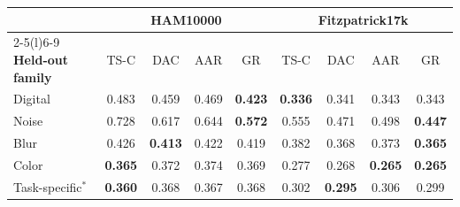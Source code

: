 \begin{tabular}{@{}lcccccccc@{}}
\toprule
 & \multicolumn{4}{c}{\textbf{HAM10000}} & \multicolumn{4}{c}{\textbf{Fitzpatrick17k}} \\
\cmidrule(lr){2-5}\cmidrule(l){6-9}
\textbf{Held-out family} & TS-C & DAC & AAR & GR & TS-C & DAC & AAR & GR \\
\midrule
Digital & 0.483 & 0.459 & 0.469 & \textbf{0.423} & \textbf{0.336} & 0.341 & 0.343 & 0.343 \\
Noise & 0.728 & 0.617 & 0.644 & \textbf{0.572} & 0.555 & 0.471 & 0.498 & \textbf{0.447} \\
Blur & 0.426 & \textbf{0.413} & 0.422 & 0.419 & 0.382 & 0.368 & 0.373 & \textbf{0.365} \\
Color & \textbf{0.365} & 0.372 & 0.374 & 0.369 & 0.277 & 0.268 & \textbf{0.265} & \textbf{0.265} \\
Task-specific$^*$ & \textbf{0.360} & 0.368 & 0.367 & 0.368 & 0.302 & \textbf{0.295} & 0.306 & 0.299 \\
\bottomrule
\end{tabular}

